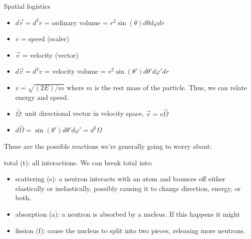 \documentclass[12pt]{article}
\newcommand{\vOmega}{\ensuremath{\hat{\Omega}}}
\begin{document}
Spatial logistics
\begin{itemize}
\item $d\vec{r} = d^3r$ = ordinary volume = $r^2 \sin(\theta) d\theta d\varphi dr$
%
\item $v$ = speed (scaler)
\item $\vec{v}$ = velocity (vector)
\item $d\vec{v} = d^3v$ = velocity volume = $v^2 \sin(\theta')d\theta' d\varphi' dr$
\item $v = \sqrt{(2E)/m}$ where $m$ is the rest mass of the particle. Thus, we can relate energy and speed.

\item $\vOmega$: unit directional vector in velocity space, $\vec{v} = v\vOmega$
\item $d\vOmega = \sin(\theta')d\theta' d\varphi' =  d^2\Omega$
\end{itemize}

These are the possible reactions we're generally going to worry about:

\hspace*{1em}total (t): all interactions. We can break total into:
\begin{itemize}
\item scattering (s): a neutron interacts with an atom and bounces off either elastically or inelastically, possibly causing it to change direction, energy, or both.
\item absorption (a): a neutron is absorbed by a nucleus. If this happens it might
\item fission (f): cause the nucleus to split into two pieces, releasing more neutrons.
\end{itemize}
\end{document}
